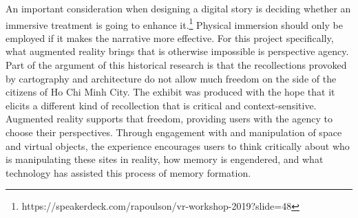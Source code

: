 An important consideration when designing a digital story is deciding whether an immersive treatment is going to enhance it.\footnote{https://speakerdeck.com/rapoulson/vr-workshop-2019?slide=48} Physical immersion should only be employed if it makes the narrative more effective. For this project specifically, what augmented reality brings that is otherwise impossible is perspective agency. Part of the argument of this historical research is that the recollections provoked by cartography and architecture do not allow much freedom on the side of the citizens of Ho Chi Minh City. The exhibit was produced with the hope that it elicits a different kind of recollection that is critical and context-sensitive. Augmented reality supports that freedom, providing users with the agency to choose their perspectives. Through engagement with and manipulation of space and virtual objects, the experience encourages users to think critically about who is manipulating these sites in reality, how memory is engendered, and what technology has assisted this process of memory formation.